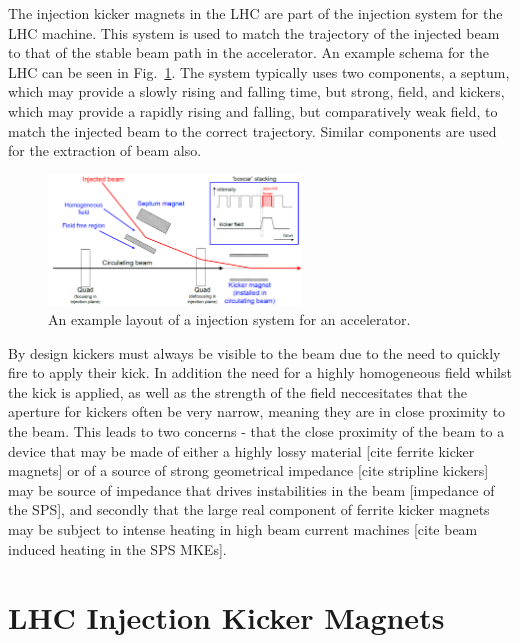 The injection kicker magnets in the LHC are part of the injection system for the LHC machine. This system is used to match the trajectory of the injected beam to that of the stable beam path in the accelerator. An example schema for the LHC can be seen in Fig.~\ref{fig:injection-system-schema}. The system typically uses two components, a septum, which may provide a slowly rising and falling time, but strong, field, and kickers, which may provide a rapidly rising and falling, but comparatively weak field, to match the injected beam to the correct trajectory. Similar components are used for the extraction of beam also.

\begin{figure}
\begin{center}
\includegraphics[width=0.6\textwidth]{LHC_MKI/figures/injection-system.png}
\end{center}
\label{fig:injection-system-schema}
\caption{An example layout of a injection system for an accelerator.}
\end{figure}

By design kickers must always be visible to the beam due to the need to quickly fire to apply their kick. In addition the need for a highly homogeneous field whilst the kick is applied, as well as the strength of the field neccesitates that the aperture for kickers often be very narrow, meaning they are in close proximity to the beam. This leads to two concerns - that the close proximity of the beam to a device that may be made of either a highly lossy material [cite ferrite kicker magnets] or of a source of strong geometrical impedance [cite stripline kickers] may be source of impedance that drives instabilities in the beam [impedance of the SPS], and secondly that the large real component of ferrite kicker magnets may be subject to intense heating in high beam current machines [cite beam induced heating in the SPS MKEs]. 

\section{LHC Injection Kicker Magnets}

